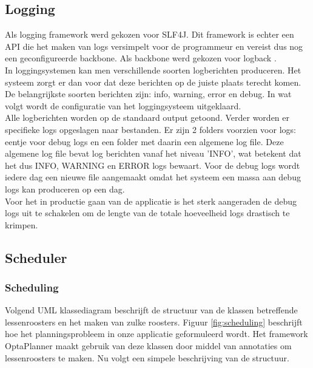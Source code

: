 \subsection{Logging}
\label{subsec:logging}
Als logging framework werd gekozen voor SLF4J\cite{slf4j}.
Dit framework is echter een API die het maken van logs versimpelt voor de programmeur en vereist dus nog een geconfigureerde backbone.
Als backbone werd gekozen voor logback \cite{logback}.\\

In loggingsystemen kan men verschillende soorten logberichten produceren. 
Het systeem zorgt er dan voor dat deze berichten op de juiste plaats terecht komen.
De belangrijkste soorten berichten zijn: info, warning, error en debug.
In wat volgt wordt de configuratie van het loggingsysteem uitgeklaard.\\

Alle logberichten worden op de standaard output getoond.
Verder worden er specifieke logs opgeslagen naar bestanden.
Er zijn 2 folders voorzien voor logs: eentje voor debug logs en een folder met daarin een algemene log file.
Deze algemene log file bevat log berichten vanaf het niveau 'INFO', wat betekent dat het dus INFO, WARNING en ERROR logs bewaart.
Voor de debug logs wordt iedere dag een nieuwe file aangemaakt omdat het systeem een massa aan debug logs kan produceren op een dag.\\

Voor het in productie gaan van de applicatie is het sterk aangeraden de debug logs uit te schakelen om de lengte van de totale hoeveelheid logs drastisch te krimpen.

\subsection{Scheduler}
\subsubsection{Scheduling}
\label{subsec:scheduleclass}
Volgend UML klassediagram beschrijft de structuur van de klassen betreffende lessenroosters en het maken van zulke roosters.
Figuur \ref{fig:scheduling} beschrijft hoe het planningsprobleem in onze applicatie geformuleerd wordt.
Het framework OptaPlanner\cite{optaplanner} maakt gebruik van deze klassen door middel van annotaties om lessenroosters te maken.
Nu volgt een simpele beschrijving van de structuur.\\

